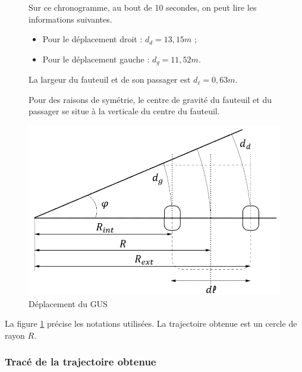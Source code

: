 \begin{figure}[ht!]
\begin{minipage}{0.55\linewidth}
Sur ce chronogramme, au bout de 10 secondes, on peut lire les informations suivantes.
\begin{itemize}
 \item Pour le déplacement droit : $d_d=13,15m$ ;
 \item Pour le déplacement gauche : $d_g=11,52m$.
\end{itemize}

La largeur du fauteuil et de son passager est $d_\ell=0,63m$.

Pour des raisons de symétrie, le centre de gravité du fauteuil et du passager se situe à la verticale du centre du fauteuil.
\end{minipage}\hfill
\begin{minipage}{0.55\linewidth}
\centering\includegraphics[width=0.8\linewidth]{img/fig11}
\caption{\label{fig11}Déplacement du GUS}
\end{minipage}
\end{figure}

La figure \ref{fig11} précise les notations utilisées. La trajectoire obtenue est un cercle de rayon $R$.



\newpage

\subsubsection{Tracé de la trajectoire obtenue}

